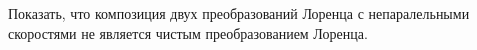 \begin{tproblem}
  Показать, что композиция двух преобразований Лоренца с
  непаралельными скоростями не является чистым преобразованием Лоренца.
\end{tproblem}
